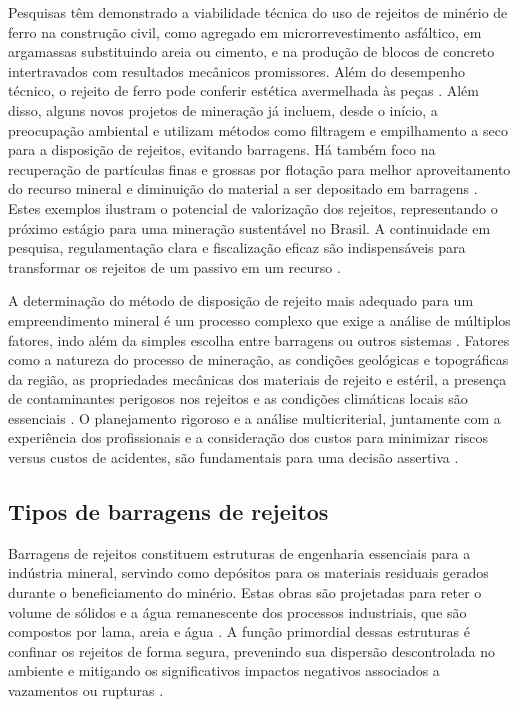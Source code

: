 Pesquisas têm demonstrado a viabilidade técnica do uso de rejeitos de minério de ferro na construção civil, como agregado em microrrevestimento asfáltico, em argamassas substituindo areia ou cimento, e na produção de blocos de concreto intertravados com resultados mecânicos promissores. Além do desempenho técnico, o rejeito de ferro pode conferir estética avermelhada às peças \cite{freire2020}. Além disso, alguns novos projetos de mineração já incluem, desde o início, a preocupação ambiental e utilizam métodos como filtragem e empilhamento a seco para a disposição de rejeitos, evitando barragens. Há também foco na recuperação de partículas finas e grossas por flotação para melhor aproveitamento do recurso mineral e diminuição do material a ser depositado em barragens \cite{pmb2023}. Estes exemplos ilustram o potencial de valorização dos rejeitos, representando o próximo estágio para uma mineração sustentável no Brasil. A continuidade em pesquisa, regulamentação clara e fiscalização eficaz são indispensáveis para transformar os rejeitos de um passivo em um recurso \cite{ibramlivroverde2022}.

A determinação do método de disposição de rejeito mais adequado para um empreendimento mineral é um processo complexo que exige a análise de múltiplos fatores, indo além da simples escolha entre barragens ou outros sistemas \cite{lozano2006}. Fatores como a natureza do processo de mineração, as condições geológicas e topográficas da região, as propriedades mecânicas dos materiais de rejeito e estéril, a presença de contaminantes perigosos nos rejeitos e as condições climáticas locais são essenciais \cite{ibram2016}. O planejamento rigoroso e a análise multicriterial, juntamente com a experiência dos profissionais e a consideração dos custos para minimizar riscos versus custos de acidentes, são fundamentais para uma decisão assertiva \cite{lozano2006}.

\subsection{Tipos de barragens de rejeitos}
\label{subsec:tipos_barragens}

Barragens de rejeitos constituem estruturas de engenharia essenciais para a indústria mineral, servindo como depósitos para os materiais residuais gerados durante o beneficiamento do minério. Estas obras são projetadas para reter o volume de sólidos e a água remanescente dos processos industriais, que são compostos por lama, areia e água \cite{lozano2006, warzynski2023}. A função primordial dessas estruturas é confinar os rejeitos de forma segura, prevenindo sua dispersão descontrolada no ambiente e mitigando os significativos impactos negativos associados a vazamentos ou rupturas \cite{warzynski2023}.

